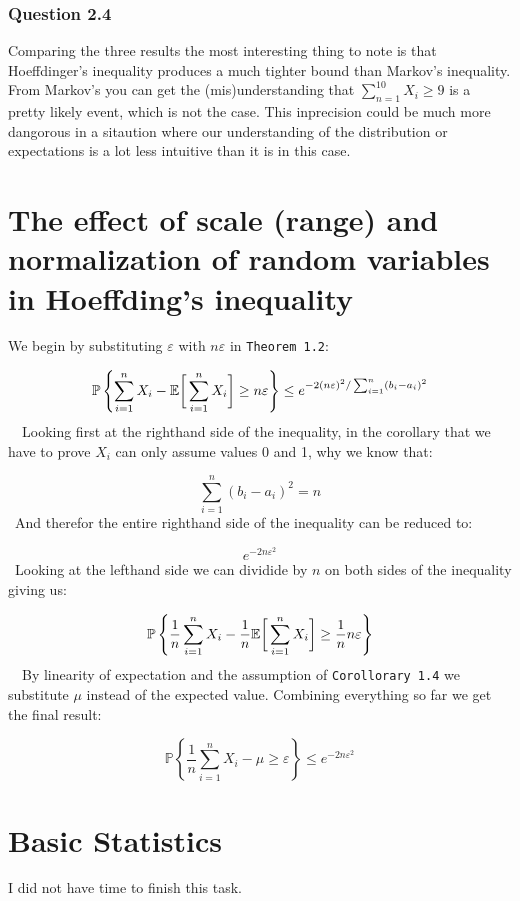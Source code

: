 \documentclass{article}
\begin{document}
\subsubsection*{Question 2.4}
Comparing the three results the most interesting thing to note is that
Hoeffdinger's inequality produces a much tighter bound than Markov's
inequality. From Markov's you can get the (mis)understanding that
\(\sum_{n=1}^{10} X_i \ge 9\) is a pretty likely event, which is not the
case. This inprecision could be much more dangorous in a sitaution where our
understanding of the distribution or expectations is a lot less intuitive than
it is in this case.



\section{The effect of scale (range) and normalization of random variables in Hoeffding’s inequality}
We begin by substituting \(\varepsilon\) with \(n\varepsilon\) in \texttt{Theorem 1.2}:

\[
\mathbb{P}\left\{\displaystyle\sum_{i=1}^{n} X_i -
{\mathbb{E}}\bigg[\displaystyle\sum_{i=1}^{n} X_i \bigg] \ge n\varepsilon \right\}
\le e^{-2(n\varepsilon)^2/\sum_{i=1}^{n}(b_i-a_i)^2}
\]
\
\
Looking first at the righthand side of the inequality, in the corollary that
we have to prove \(X_i\) can only assume values 0 and 1, why we know that:

\[
\sum_{i=1}^{n}(b_i-a_i)^2 = n
\]
\
And therefor the entire righthand side of the inequality can be reduced to:

\[
e^{-2n\varepsilon^2}
\]
\
Looking at the lefthand side we can dividide by \(n\) on both
sides of the inequality giving us:

\[
\mathbb{P}\left\{\dfrac{1}{n}\displaystyle\sum_{i=1}^{n} X_i -
\dfrac{1}{n}{\mathbb{E}}\bigg[\displaystyle\sum_{i=1}^{n} X_i \bigg] \ge \dfrac{1}{n} n\varepsilon \right\}
\]
\
\
By linearity of expectation and the assumption of \texttt{Corollorary 1.4}
we substitute \(\mu\) instead of the expected value. Combining everything so far
we get the final result:

\[
\mathbb{P}\left\{\dfrac{1}{n}\displaystyle\sum_{i=1}^{n} X_i -
\mu \ge \varepsilon \right\} \le e^{-2n\varepsilon^2}
\]

\section{Basic Statistics}
I did not have time to finish this task.
\end{document}
